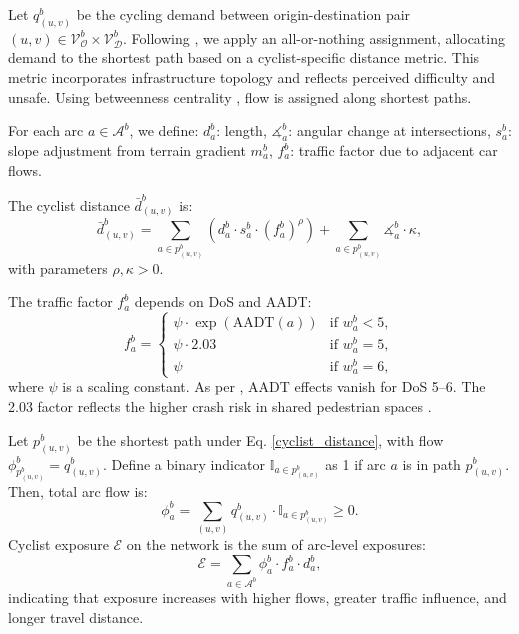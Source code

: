 \documentclass[letterpaper, 10 pt, conference]{ieeeconf}  %
\begin{document}
Let $q_{(u,v)}^b$ be the cycling demand between origin-destination pair $(u,v) \in \mathcal{V}_{\mathcal{O}}^b \times \mathcal{V}_{\mathcal{D}}^b$. Following \cite{mesbah2012bilevel}, we apply an all-or-nothing assignment, allocating demand to the shortest path based on a cyclist-specific distance metric. This metric incorporates infrastructure topology and reflects perceived difficulty and unsafe. Using betweenness centrality \cite{jurado2025improving}, flow is assigned along shortest paths.

For each arc $a \in \mathcal{A}^b$, we define: $d_a^b$: length, $\measuredangle_a^b$: angular change at intersections, $s_a^b$: slope adjustment from terrain gradient $m_a^b$, $f_a^b$: traffic factor due to adjacent car flows.

The cyclist distance $\bar{d}_{(u,v)}^b$ is:
\begin{equation}
\label{cyclist_distance}
    \bar{d}_{(u,v)}^b = \sum_{a \in p_{(u,v)}^b} \left( d_a^b \cdot s_a^b \cdot (f_a^b)^{\rho} \right) + \sum_{a \in p_{(u,v)}^b} \measuredangle_a^b \cdot \kappa,
\end{equation}
with parameters $\rho, \kappa > 0$.

The traffic factor $f_a^b$ depends on DoS and AADT:
\begin{equation}
    f_a^b =
    \begin{cases}
        \psi \cdot \exp(\text{AADT}(a)) & \text{if } w_a^b < 5, \\
        \psi \cdot 2.03 & \text{if } w_a^b = 5, \\
        \psi & \text{if } w_a^b = 6,
    \end{cases}
\end{equation}
where $\psi$ is a scaling constant. As per \cite{cyclerap2024}, AADT effects vanish for DoS 5–6. The 2.03 factor reflects the higher crash risk in shared pedestrian spaces \cite{mesimaki2021near}.

Let $p_{(u,v)}^b$ be the shortest path under Eq. \eqref{cyclist_distance}, with flow $\phi_{p_{(u,v)}^b}^b = q_{(u,v)}^b$. Define a binary indicator $\mathbb{I}_{a \in p_{(u,v)}^b}$ as 1 if arc $a$ is in path $p_{(u,v)}^b$. Then, total arc flow is:
\begin{equation}
\label{eq_flows}
    \phi_a^b = \sum_{(u,v)} q_{(u,v)}^b \cdot \mathbb{I}_{a \in p_{(u,v)}^b} \geq 0.
\end{equation}
Cyclist exposure $\mathcal{E}$ on the network is the sum of arc-level exposures:
\begin{equation}
\label{arc_exposure}
    \mathcal{E} = \sum_{a \in \mathcal{A}^b} \phi_a^b \cdot f_a^b \cdot d_a^b,
\end{equation}
indicating that exposure increases with higher flows, greater traffic influence, and longer travel distance.
\end{document}
